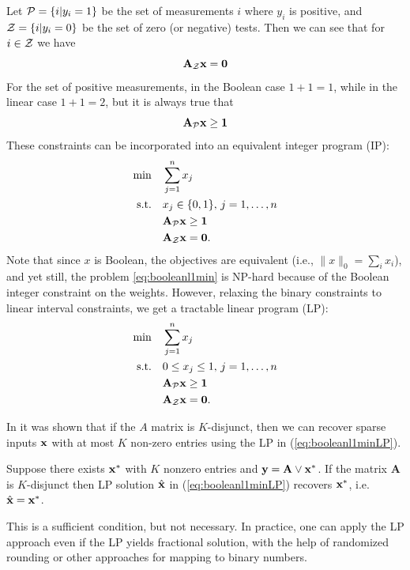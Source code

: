Let $\mathcal{P}= \{i | y_i = 1\}$ be the set of measurements $i$ where $y_i$ is positive,
and $\mathcal{Z} = \{i | y_i = 0\}$ be the set of zero (or negative) tests. Then we can
see that for $i \in \mathcal{Z}$ we have
\begin{equation}
\mathbf{A}_{\mathcal{Z}}\mathbf{x} = \mathbf{0}
\end{equation}
For the set of positive measurements, in the Boolean case $1+1 = 1$, while
in the linear case $1 + 1 = 2$, but it is always true that
\begin{equation}
\mathbf{A}_{\mathcal{P}}\mathbf{x} \ge \mathbf{1}
\end{equation}
These constraints can be incorporated into an equivalent integer program (IP):
\begin{align}
\label{eq:booleanl1min}
	\min\quad &\sum_{j=1}^{n} x_j \\
	\textrm{s.t.\quad} & x_j \in \{0,1\},\,j = 1,\ldots,n\nonumber\\
		& \mathbf{A}_{\mathcal{P}}\mathbf{x} \ge \mathbf{1}\nonumber\\
		& \mathbf{A}_{\mathcal{Z}}\mathbf{x} = \mathbf{0}.\nonumber
\end{align}
Note that since $x$ is Boolean, the objectives are equivalent (i.e., $\|x\|_0=\sum_i{x_i}$), and yet still, the problem
\eqref{eq:booleanl1min} is NP-hard because of the Boolean integer constraint on the weights. However, relaxing the binary constraints to linear interval constraints, we get a tractable linear program (LP):
\begin{align}
\label{eq:booleanl1minLP}
	\min\quad &\sum_{j=1}^{n} x_j \\
	\textrm{s.t.\quad} & 0\leq x_j \leq 1, \,j = 1,\ldots,n\nonumber\\
		& \mathbf{A}_{\mathcal{P}}\mathbf{x} \ge \mathbf{1}\nonumber\\
		& \mathbf{A}_{\mathcal{Z}}\mathbf{x} = \mathbf{0}.\nonumber
\end{align}

In \cite{MalioutovM2012} it was shown that if the $A$ matrix is $K$-disjunct, 
then we can recover sparse inputs $\mathbf{x}$ with at most $K$ non-zero entries using 
the LP in (\ref{eq:booleanl1minLP}).
\begin{theorem}
\label{thm:LP_recovery}
Suppose there exists $\mathbf{x}^*$ with $K$ nonzero entries and
$\mathbf{y} = \mathbf{A} \lor \mathbf{x}^*$. If the matrix $\mathbf{A}$ is $K$-disjunct then
LP solution $\hat{\mathbf{x}}$ in (\ref{eq:booleanl1minLP}) recovers $\mathbf{x}^*$, i.e. $\hat{\mathbf{x}} = \mathbf{x}^*$.
\end{theorem}

This is a sufficient condition, but not necessary. In practice, one can apply
the LP approach even if the LP yields fractional solution, with the help
of randomized rounding or other approaches for mapping to binary numbers.

